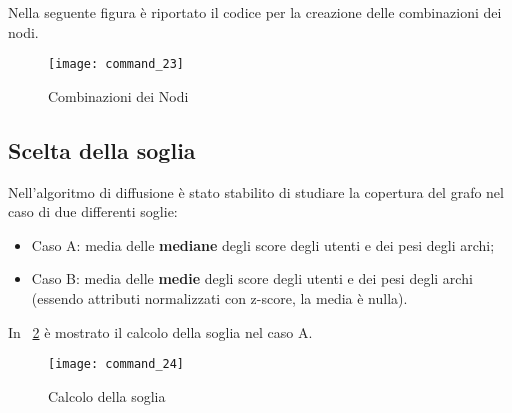 Nella seguente figura è riportato il codice per la creazione delle combinazioni dei
nodi.
\begin{figure}[!htbp]
  \texttt{[image: command\_23]}
  \caption{Combinazioni dei Nodi}
  \label{command_23}
\end{figure}
\clearpage

\subsection{Scelta della soglia}
Nell'algoritmo di diffusione è stato stabilito di studiare la copertura del grafo
nel caso di due differenti soglie:
\begin{itemize}
	\item Caso A:  media delle \textbf{mediane} degli score degli utenti e dei pesi degli archi;
	\item Caso B:  media delle \textbf{medie} degli score degli utenti e dei pesi degli archi
				(essendo attributi normalizzati con z-score, la media è nulla).
\end{itemize}
In \figurename~\ref{command_24} è mostrato il calcolo della soglia nel caso A.

\begin{figure}[!htbp]
  \texttt{[image: command\_24]}
  \caption{Calcolo della soglia}
  \label{command_24}
\end{figure}
\clearpage

